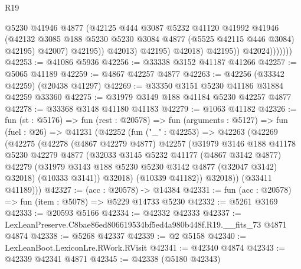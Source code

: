 \begin{lexlean}{R19}
\begin{coremodule}
                                @5230
                                @41946
                                @4877
                                (@42125
                                  @444
                                  @3087
                                  @5232
                                  @41120
                                  @41992
                                  @41946
                                  (@42132
                                    @3085
                                    @188
                                    @5230
                                    @5230
                                    @3084
                                    @4877
                                    (@5525 @42115 @446 @3084)
                                    @42195)
                                  @42007)
                                @42195))
                            @42013)
                          @42195)
                        @42018)
                      @42195))
                  @42024)))))))
@42253 := @41086 @5936
@42256 := @33338 @3152 @41187 @41266
@42257 := @5065 @41189
@42259 := @4867 @42257 @4877
@42263 := @42256 (@33342 @42259) (@20438 @41297)
@42269 := @33350 @3151 @5230 @41186 @31884 @42259 @33360
@42275 := @31979 @3149 @188 @41184 @5230 @42257 @4877
@42278 := @33368 @3148 @41180 @41183
@42279 := @1063 @41182
@42326 := fun (st : @5176) =>
  fun (rest : @20578) =>
  fun (arguments : @5127) =>
  fun (fuel : @26) =>
  @41231
    (@42252
      (fun ("_" : @42253) =>
      @42263
        (@42269
          (@42275
            (@42278
              (@4867 @42279 @4877)
              @42257
              (@31979
                @3146
                @188
                @41178
                @5230
                @42279
                @4877
                (@32033
                  @3145
                  @5232
                  @41177
                  (@4867 @3142 @4877)
                  @42279
                  (@31979 @3143 @188 @5230 @5230 @3142 @4877 (@32047 @3142) @32018)
                  (@10333 @3141))
                @32018)
              (@10339 @41182))
            @32018))
        (@33411 @41189)))
@42327 := (acc : @20578) -> @14384
@42331 := fun (acc : @20578) => fun (item : @5078) => @5229 @14733 @5230
@42332 := @5261 @3169
@42333 := @20593 @5166
@42334 := @42332 @42333
@42337 := LexLeanPreserve.C8bae86ed806619534bf5ed4a980b448f.R19.__fits_73 @4871 @4874
@42338 := @5268 @42337
@42339 := @2 @5158
@42340 := LexLeanBoot.LexiconLre.RWork.RVisit
@42341 := @42340 @4874
@42343 := @42339 @42341 @4871
@42345 := @42338 (@5180 @42343)

\end{coremodule}
\end{lexlean}
